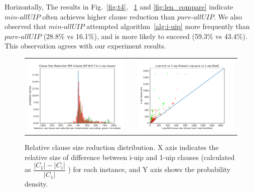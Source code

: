 \documentclass[runningheads]{llncs}
\newcommand{\fss}[2]{\fontsize{#1}{#2}\selectfont}
\newcommand{\allUipPure}{\textit{pure-allUIP}\xspace}
\newcommand{\allUipMin}{\textit{min-allUIP}\xspace}
\begin{document}
Horizontally, The results in Fig.~\ref{fig:t4}, ~\ref{fig:len_pdf} and \ref{fig:len_compare} indicate $\allUipMin$ often achieves higher clause reduction than $\allUipPure$. We also observed that $\allUipMin$
attempted algorithm~\ref{alg:i-uip} more frequently than $\allUipPure$ (28.8\% vs 16.1\%), and is more likely to succeed (59.3\% vs 43.4\%). This observation agrees with our experiment results. 

\begin{figure}[t!]
{\fss{8pt}{10pt}
\begin{tabular}[t]{l c l}
  
  \begin{minipage}[t]{0.5\textwidth}
   \includegraphics[width=\textwidth]{figures/clause_reduction_PDF}
   \caption{Relative clause size reduction distribution. X axis
      indicates the relative size of difference between i-uip and
      1-uip clauses (calculated as
      $\dfrac{|C_1|-|C_i|}{|C_1|}$ ) for
      each instance, and Y axis shows the probability density.}
       \label{fig:len_pdf}
  \end{minipage}
  & &
  \begin{minipage}[t]{0.5\textwidth}
    \includegraphics[width=\textwidth]{figures/i-uip-sizes-compare.pdf}

\end{minipage}
\end{tabular}}
\end{figure}
\end{document}
